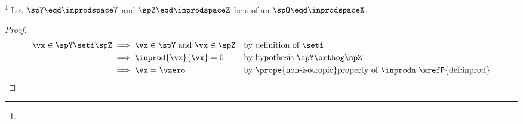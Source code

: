 \begin{theorem}
\footnote{
  }
\label{thm:YoZ==>YZ0}
Let $\spY\eqd\inprodspaceY$ and $\spZ\eqd\inprodspaceZ$ be s
of an  $\spO\eqd\inprodspaceX$.
\thmbox{
  \spY \orthog \spZ
  \qquad\implies\qquad
  \setY\seti\setZ=\setn{\vzero}
  }
\end{theorem}
\begin{proof}
\begin{align*}
  \vx\in\spY\seti\spZ
    & \implies \vx\in\spY \text{ and } \vx\in\spZ
    && \text{by definition of $\seti$}
  \\& \implies \inprod{\vx}{\vx}=0
    && \text{by hypothesis $\spY\orthog\spZ$}
  \\& \implies \vx=\vzero
    && \text{by \prope{non-isotropic}property of $\inprodn$ \xrefP{def:inprod}}
\end{align*}
\end{proof}

